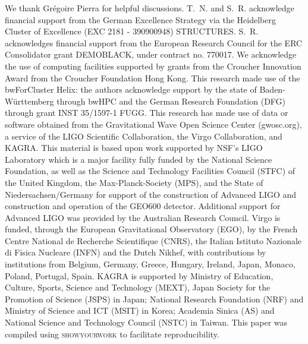 \documentclass[sn-aps, pdflatex, iicol]{sn-jnl}
\begin{document}
\backmatter


We thank Grégoire Pierra for helpful discussions.
T.~N. and S.~R. acknowledge financial support from the German Excellence Strategy via the Heidelberg Cluster of Excellence (EXC 2181 - 390900948) STRUCTURES.
S.~R. acknowledges financial support from the European Research Council for the ERC Consolidator grant DEMOBLACK, under contract no. 770017. 
We acknowledge the use of computing facilities supported by grants from the Croucher Innovation Award from the Croucher Foundation Hong Kong.
This research made use of the bwForCluster Helix: the authors acknowledge support by the state of Baden-Württemberg through bwHPC and the German Research Foundation (DFG) through grant INST 35/1597-1 FUGG.
This research has made use of data or software obtained from the Gravitational Wave Open Science Center (gwosc.org), a service of the LIGO Scientific Collaboration, the Virgo Collaboration, and KAGRA. This material is based upon work supported by NSF's LIGO Laboratory which is a major facility fully funded by the National Science Foundation, as well as the Science and Technology Facilities Council (STFC) of the United Kingdom, the Max-Planck-Society (MPS), and the State of Niedersachsen/Germany for support of the construction of Advanced LIGO and construction and operation of the GEO600 detector. Additional support for Advanced LIGO was provided by the Australian Research Council. Virgo is funded, through the European Gravitational Observatory (EGO), by the French Centre National de Recherche Scientifique (CNRS), the Italian Istituto Nazionale di Fisica Nucleare (INFN) and the Dutch Nikhef, with contributions by institutions from Belgium, Germany, Greece, Hungary, Ireland, Japan, Monaco, Poland, Portugal, Spain. KAGRA is supported by Ministry of Education, Culture, Sports, Science and Technology (MEXT), Japan Society for the Promotion of Science (JSPS) in Japan; National Research Foundation (NRF) and Ministry of Science and ICT (MSIT) in Korea; Academia Sinica (AS) and National Science and Technology Council (NSTC) in Taiwan.
This paper was compiled using \textsc{showyourwork} \cite{Luger2021} to facilitate reproducibility.


\end{document}
